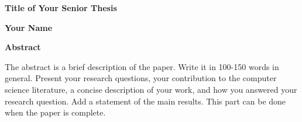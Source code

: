\begin{center}
    \Large
    \textbf{Title of Your Senior Thesis}
    
    \vspace{0.4cm}
    \large
    
    \vspace{0.4cm}
    \textbf{Your Name}
    
    \vspace{0.9cm}
    \textbf{Abstract}
\end{center}


The abstract is a brief description of the paper. Write it in 100-150 words in general. Present your research questions, your contribution to the computer science literature, a concise description of your work, and how you answered your research question. Add a statement of the main results. 
This part can be done when the paper is complete. 